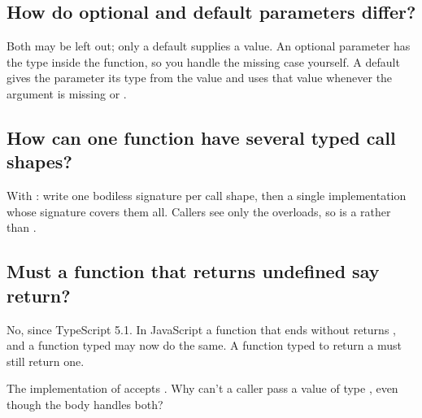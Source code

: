 \label{ch:c19}

\subsection{How do optional and default parameters differ?}%
Both may be left out; only a default supplies a value. An optional parameter  has the type  inside the function, so you handle the missing case yourself. A default  gives the parameter its type from the value and uses that value whenever the argument is missing or .

\subsection{How can one function have several typed call shapes?}%
With : write one bodiless signature per call shape, then a single implementation whose signature covers them all. Callers see only the overloads, so  is a  rather than .

\subsection{Must a function that returns undefined say return?}%
No, since TypeScript 5.1. In JavaScript a function that ends without  returns , and a function typed  may now do the same. A function typed to return a  must still return one.

\begin{ponder}The implementation of  accepts . Why can't a caller pass a value of type , even though the body handles both?\end{ponder}
